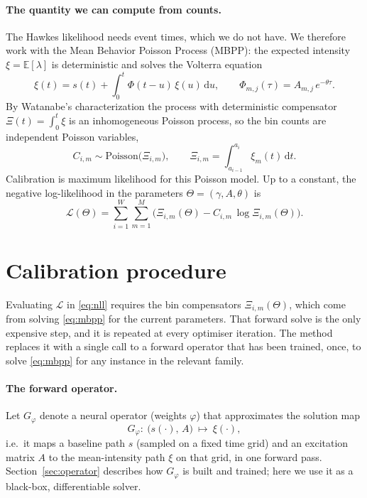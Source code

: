 \documentclass[11pt]{article}
\begin{document}
\paragraph{The quantity we can compute from counts.} The Hawkes likelihood needs event
times, which we do not have. We therefore work with the Mean Behavior Poisson Process
(MBPP): the expected intensity $\xi=\mathbb{E}[\lambda]$ is deterministic and solves the
Volterra equation
\begin{equation}
\xi(t) = s(t) + \int_0^t \Phi(t-u)\,\xi(u)\,\mathrm{d}u,
\qquad \Phi_{m,j}(\tau)=A_{m,j}\,e^{-\theta\tau}.
\label{eq:mbpp}
\end{equation}
By Watanabe's characterization the process with deterministic compensator
$\Xi(t)=\int_0^t\xi$ is an inhomogeneous Poisson process, so the bin counts are
independent Poisson variables,
\begin{equation}
C_{i,m}\sim \mathrm{Poisson}\big(\Xi_{i,m}\big),\qquad
\Xi_{i,m}=\int_{a_{i-1}}^{a_i}\xi_m(t)\,\mathrm{d}t .
\label{eq:poisson}
\end{equation}
Calibration is maximum likelihood for this Poisson model. Up to a constant, the
negative log-likelihood in the parameters $\Theta=(\gamma,A,\theta)$ is
\begin{equation}
\mathcal{L}(\Theta) = \sum_{i=1}^{W}\sum_{m=1}^{M}
\Big(\Xi_{i,m}(\Theta) - C_{i,m}\,\log \Xi_{i,m}(\Theta)\Big).
\label{eq:nll}
\end{equation}

\section{Calibration procedure}
\label{sec:pipeline}

Evaluating $\mathcal{L}$ in \eqref{eq:nll} requires the bin compensators
$\Xi_{i,m}(\Theta)$, which come from solving \eqref{eq:mbpp} for the current
parameters. That forward solve is the only expensive step, and it is repeated at every
optimiser iteration. The method replaces it with a single call to a forward operator
that has been trained, once, to solve \eqref{eq:mbpp} for any instance in the relevant
family.

\paragraph{The forward operator.} Let $G_\varphi$ denote a neural operator (weights
$\varphi$) that approximates the solution map
\begin{equation}
G_\varphi:\ \big(s(\cdot),\,A\big)\ \longmapsto\ \xi(\cdot),
\label{eq:operator}
\end{equation}
i.e.\ it maps a baseline path $s$ (sampled on a fixed time grid) and an excitation
matrix $A$ to the mean-intensity path $\xi$ on that grid, in one forward pass.
Section~\ref{sec:operator} describes how $G_\varphi$ is built and trained; here we use
it as a black-box, differentiable solver.
\end{document}
